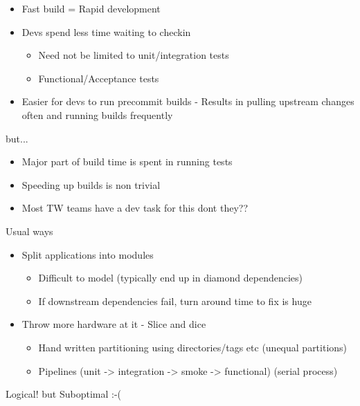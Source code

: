 \documentclass{beamer}
\begin{document}
\begin{frame}
  \begin{centering}
    \begin{itemize}
    \item Fast build = Rapid development
      \pause
    \item Devs spend less time waiting to checkin
      \begin{itemize}
      \item Need not be limited to unit/integration tests          
      \item Functional/Acceptance tests
      \end{itemize}
      \pause
    \item Easier for devs to run precommit builds - Results in pulling upstream changes often and running builds frequently
    \end{itemize}
  \end{centering}
\end{frame}

\begin{frame}{but...}
  \begin{centering}
    \begin{itemize}
    \item Major part of build time is spent in running tests
      \pause
    \item Speeding up builds is non trivial
      \pause
    \item Most TW teams have a dev task for this dont they??
    \end{itemize}
  \end{centering}
\end{frame}

\begin{frame}{Usual ways}
  \begin{centering}
    \begin{itemize}
    \item Split applications into modules
      \pause
      \begin{itemize}
      \item Difficult to model (typically end up in diamond dependencies)
        \pause
      \item If downstream dependencies fail, turn around time to fix is huge
      \end{itemize}      
      \pause
    \item Throw more hardware at it - Slice and dice
      \pause
      \begin{itemize}
      \item Hand written partitioning using directories/tags etc (unequal partitions)
        \pause
      \item Pipelines (unit -> integration -> smoke -> functional) (serial process)
      \end{itemize}
    \end{itemize}
    \pause
    Logical! but Suboptimal :-(
  \end{centering}
\end{frame}
\end{document}
